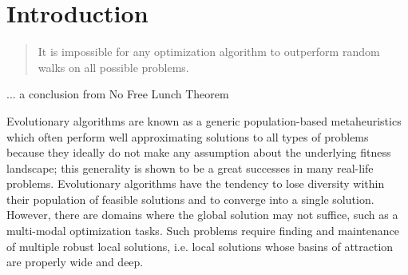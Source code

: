 
\chapter{Introduction}
\label{Introduction} 

\begin{quotation}
 It is impossible for any optimization algorithm to outperform random walks on all possible problems.
\end{quotation}
\begin{flushright}
 ... a conclusion from No Free Lunch Theorem
\end{flushright}

Evolutionary algorithms are known as a generic population-based metaheuristics
which often perform well approximating solutions to all
types of problems because they ideally do not make any assumption about the underlying fitness landscape; 
this generality is shown to be a great successes in many real-life problems.
Evolutionary algorithms have the tendency to lose diversity within
their population of feasible solutions and to converge into a single solution.
However, there are domains where the global solution may not suffice, such
as a multi-modal optimization tasks. 
Such problems require finding and maintenance of multiple robust local
solutions, i.e. local solutions whose basins of attraction are properly wide and deep.

